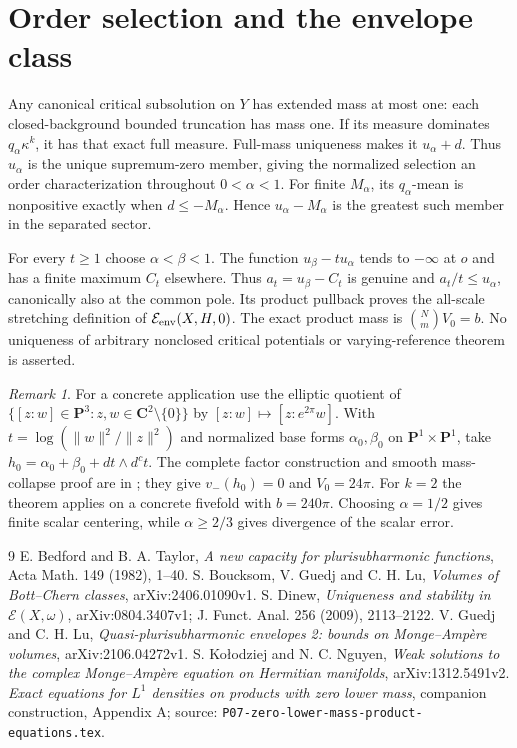 \documentclass[11pt]{article}
\newcommand{\E}{\mathcal E}
\theoremstyle{remark}\newtheorem{remark}[theorem]{Remark}
\begin{document}
\section{Order selection and the envelope class}
Any canonical critical subsolution on $Y$ has extended mass at most one:
each closed-background bounded truncation has mass one. If its measure
dominates $q_\alpha\kappa^k$, it has that exact full measure.
Full-mass uniqueness \cite[Theorem 1.2]{Dinew} makes it $u_\alpha+d$.
Thus $u_\alpha$ is the unique supremum-zero member, giving the normalized
selection an order characterization throughout $0<\alpha<1$.
For finite $M_\alpha$, its $q_\alpha$-mean is nonpositive exactly when
$d\leq-M_\alpha$. Hence $u_\alpha-M_\alpha$ is the greatest such member
in the separated sector.

For every $t\geq1$ choose $\alpha<\beta<1$. The function
$u_\beta-tu_\alpha$ tends to $-\infty$ at $o$ and has a finite
maximum $C_t$ elsewhere. Thus $a_t=u_\beta-C_t$ is genuine and
$a_t/t\leq u_\alpha$, canonically also at the common pole.
Its product pullback proves the all-scale stretching definition of
$\E_{\rm env}(X,H,0)$. The exact product mass is
$\binom Nm V_0=b$. No uniqueness of arbitrary nonclosed critical
potentials or varying-reference theorem is asserted.

\begin{remark}
For a concrete application use the elliptic quotient of
$\{[z:w]\in\mathbf P^3:z,w\in\mathbf C^2\setminus\{0\}\}$ by
$[z:w]\mapsto[z:e^{2\pi}w]$.
With $t=\log(\|w\|^2/\|z\|^2)$ and normalized base forms
$\alpha_0,\beta_0$ on $\mathbf P^1\times\mathbf P^1$, take
$h_0=\alpha_0+\beta_0+dt\wedge d^c t$.
The complete factor construction and smooth mass-collapse proof are in
\cite[Appendix A]{Product}; they give $v_-(h_0)=0$ and $V_0=24\pi$.
For $k=2$ the theorem applies on a concrete fivefold with
$b=240\pi$. Choosing $\alpha=1/2$ gives finite scalar centering, while
$\alpha\geq2/3$ gives divergence of the scalar error.
\end{remark}

\begin{thebibliography}{9}
 E. Bedford and B. A. Taylor,
\emph{A new capacity for plurisubharmonic functions},
Acta Math. 149 (1982), 1--40.
 S. Boucksom, V. Guedj and C. H. Lu,
\emph{Volumes of Bott--Chern classes}, arXiv:2406.01090v1.
 S. Dinew,
\emph{Uniqueness and stability in $\E(X,\omega)$},
arXiv:0804.3407v1; J. Funct. Anal. 256 (2009), 2113--2122.
 V. Guedj and C. H. Lu,
\emph{Quasi-plurisubharmonic envelopes 2: bounds on Monge--Amp\`ere volumes},
arXiv:2106.04272v1.
 S. Ko\l odziej and N. C. Nguyen,
\emph{Weak solutions to the complex Monge--Amp\`ere equation on Hermitian
manifolds}, arXiv:1312.5491v2.
 \emph{Exact equations for $L^1$ densities on products
with zero lower mass}, companion construction, Appendix A;
source: \texttt{P07-zero-lower-mass-product-equations.tex}.
\end{thebibliography}
\end{document}
